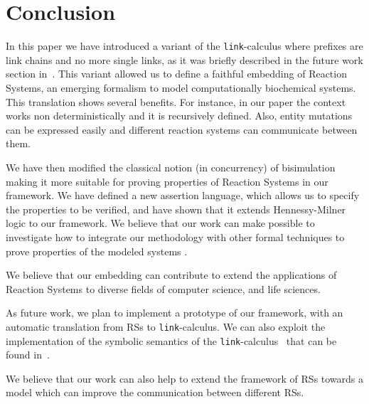 
\section{Conclusion}\label{sec:conclusion}

In this paper we have introduced a variant of the {\tt link}-calculus
where prefixes are link chains and no more single links, as it was 
briefly described in the future work section in~\cite{BBB17}.
This variant allowed us to define 
a faithful embedding of Reaction Systems,
an emerging formalism to model computationally biochemical systems.
This translation shows several benefits.
For instance, in our paper the context works non deterministically and it 
is recursively defined.
Also, entity mutations can be expressed easily and different reaction systems can
communicate between them.

We have then modified the classical notion (in concurrency) of bisimulation
making it more suitable for proving properties of Reaction Systems in our
framework.
We have defined a new assertion language, which allows us to specify
the properties to be verified, and have shown that it extends Hennessy-Milner logic
to our framework.
We believe that our work can make 
possible to investigate how to integrate our methodology
with other formal techniques to prove 
properties of the modeled systems \cite{CFHOT15,OCHF16,BBGLBH2017}.

We believe that our embedding can contribute to extend the applications
of Reaction Systems to diverse fields of computer science, and life
sciences.

As future work, we plan to implement a prototype of our framework,
with an automatic translation from RSs to  {\tt link}-calculus. 
We can also exploit the implementation of  the symbolic semantics of 
the {\tt link}-calculus~\cite{BrodoO17} that can be found in~\cite{tool}.

We believe that our work can also help to extend the framework
of RSs towards a model which can improve the communication
between different RSs.
